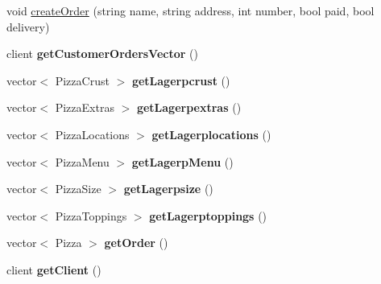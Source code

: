 \begin{CompactItemize}
\item 
void \hyperlink{class_sala_9f3c48158017cdc015a985e9712f0179}{create\-Order} (string name, string address, int number, bool paid, bool delivery)
\item 
\hypertarget{class_sala_3a31e5a83058a950f863932d3ecaef2e}{
client {\bf get\-Customer\-Orders\-Vector} ()}
\label{class_sala_3a31e5a83058a950f863932d3ecaef2e}

\item 
\hypertarget{class_sala_85a631cad1f4009e87de7da3bc52174c}{
vector$<$ Pizza\-Crust $>$ {\bf get\-Lagerpcrust} ()}
\label{class_sala_85a631cad1f4009e87de7da3bc52174c}

\item 
\hypertarget{class_sala_49f231948b80188691882a8624a4612d}{
vector$<$ Pizza\-Extras $>$ {\bf get\-Lagerpextras} ()}
\label{class_sala_49f231948b80188691882a8624a4612d}

\item 
\hypertarget{class_sala_1e720a42845186f5057b36ab8b69711a}{
vector$<$ Pizza\-Locations $>$ {\bf get\-Lagerplocations} ()}
\label{class_sala_1e720a42845186f5057b36ab8b69711a}

\item 
\hypertarget{class_sala_89b38b3e2a9835524c9fd21628f485cc}{
vector$<$ Pizza\-Menu $>$ {\bf get\-Lagerp\-Menu} ()}
\label{class_sala_89b38b3e2a9835524c9fd21628f485cc}

\item 
\hypertarget{class_sala_3b0fc00a14ac87f5c78a4ec2f508d67b}{
vector$<$ Pizza\-Size $>$ {\bf get\-Lagerpsize} ()}
\label{class_sala_3b0fc00a14ac87f5c78a4ec2f508d67b}

\item 
\hypertarget{class_sala_aeb754b87d63d395a61539294cbdf064}{
vector$<$ Pizza\-Toppings $>$ {\bf get\-Lagerptoppings} ()}
\label{class_sala_aeb754b87d63d395a61539294cbdf064}

\item 
\hypertarget{class_sala_71e41a58a2a9c2d1927676693909a42c}{
vector$<$ Pizza $>$ {\bf get\-Order} ()}
\label{class_sala_71e41a58a2a9c2d1927676693909a42c}

\item 
\hypertarget{class_sala_a1300ce1d3137fc3bd1b2938612faa1b}{
client {\bf get\-Client} ()}
\label{class_sala_a1300ce1d3137fc3bd1b2938612faa1b}

\end{CompactItemize}
